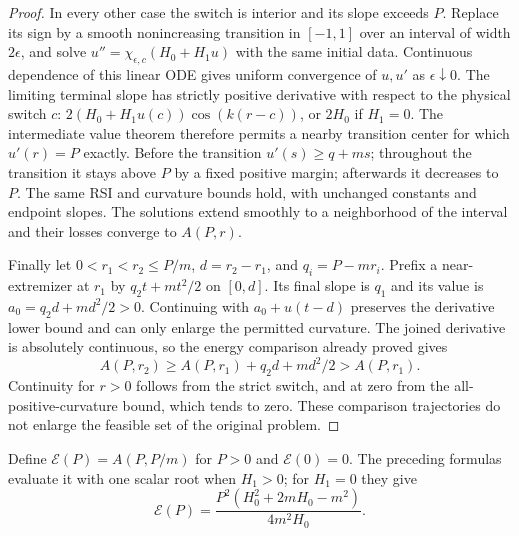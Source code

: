 \begin{proof}
In every other case the switch is interior and its slope exceeds $P$.
Replace its sign by a smooth nonincreasing transition in $[-1,1]$
over an interval of width $2\epsilon$, and solve
$u''=\chi_{\epsilon,c}(H_0+H_1u)$ with the same initial data.
Continuous dependence of this linear ODE gives uniform convergence
of $u,u'$ as $\epsilon\downarrow0$. The limiting terminal slope has
strictly positive derivative with respect to the physical switch $c$:
$2(H_0+H_1u(c))\cos(k(r-c))$, or $2H_0$ if $H_1=0$.
The intermediate value theorem therefore permits a nearby transition
center for which $u'(r)=P$ exactly. Before the transition
$u'(s)\ge q+ms$; throughout the transition it stays above $P$ by a
fixed positive margin; afterwards it decreases to $P$. The same RSI
and curvature bounds hold, with unchanged constants and endpoint slopes.
The solutions extend smoothly to a neighborhood of the interval and
their losses converge to $A(P,r)$.

Finally let $0<r_1<r_2\le P/m$, $d=r_2-r_1$, and $q_i=P-mr_i$.
Prefix a near-extremizer at $r_1$ by $q_2t+mt^2/2$ on $[0,d]$.
Its final slope is $q_1$ and its value is
$a_0=q_2d+md^2/2>0$. Continuing with $a_0+u(t-d)$ preserves the
derivative lower bound and can only enlarge the permitted curvature.
The joined derivative is absolutely continuous, so the energy comparison
already proved gives
\begin{equation}\label{compact:radial-growth}
 A(P,r_2)\ge A(P,r_1)+q_2d+md^2/2>A(P,r_1).
\end{equation}
Continuity for $r>0$ follows from the strict switch, and at zero from
the all-positive-curvature bound, which tends to zero. These comparison
trajectories do not enlarge the feasible set of the original problem.
\end{proof}

Define $\mathcal E(P)=A(P,P/m)$ for $P>0$ and $\mathcal E(0)=0$.
The preceding formulas evaluate it with one scalar root when $H_1>0$;
for $H_1=0$ they give
\begin{equation}\label{energy:constant}
 \mathcal E(P)=
 \frac{P^2(H_0^2+2mH_0-m^2)}{4m^2H_0}.
\end{equation}

